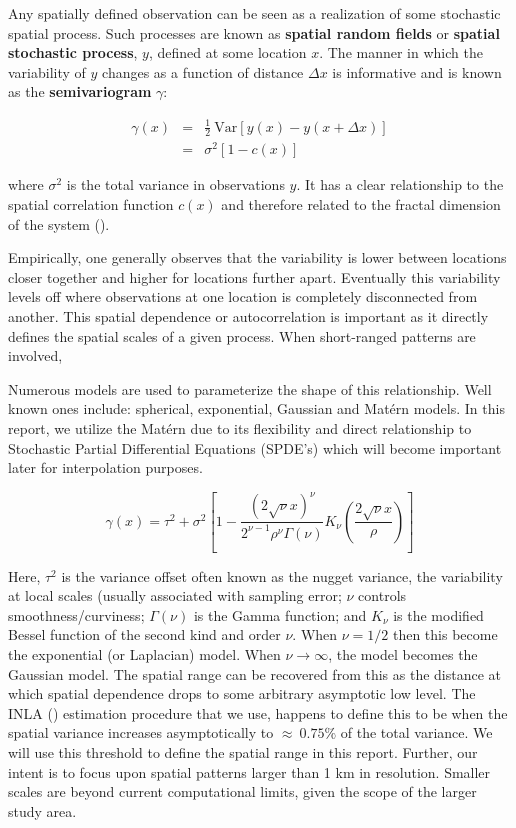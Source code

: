 \documentclass[letterpaper,portrait,11pt]{scrartcl}
\numberwithin{equation}{section}		%
\numberwithin{figure}{section}		%
\numberwithin{table}{section}				%
\begin{document}
Any spatially defined observation can be seen as a realization of some stochastic spatial process. Such  processes are known as \textbf{spatial random fields} or \textbf{spatial stochastic process}, $y$, defined at some location $x$. The manner in which the variability of $y$ changes as a function of distance $\Delta x$ is informative and is known as the \textbf{semivariogram} $\gamma$:

\begin{eqnarray*}
\label{eq:semivariogram}
\gamma(x) &=& \frac{1}{2} \ \textrm{Var} [ y(x) - y(x + \Delta x)]  \\
&=& \sigma^2 [1-c(x)] 
\end{eqnarray*}

where $\sigma^2$ is the total variance in observations $y$. It has a clear relationship to the spatial correlation function $c(x)$ and therefore related to the fractal dimension of the system (\cite{Schepers:2002:fractals}). 

Empirically, one generally observes that the variability is lower between locations closer together and higher for locations further apart. Eventually this variability levels off where observations at one location is completely disconnected from another. This spatial dependence or autocorrelation is important as it directly defines the spatial scales of a given process. When short-ranged patterns are involved, 

Numerous models are used to parameterize the shape of this relationship. Well known ones include: spherical, exponential, Gaussian and Mat\'{e}rn models. In this report, we utilize the Mat\'{e}rn due to its flexibility and direct relationship to Stochastic Partial Differential Equations (SPDE's) which will become important later for interpolation purposes. 

\begin{equation}
\gamma(x) = \tau^2 + \sigma^2 [ 1 - \frac{{(2\sqrt{\nu}x)}^\nu}{2^{\nu-1} \rho^{\nu} \Gamma(\nu)}
 K_\nu(\frac{2\sqrt{\nu}x}{\rho} ) ]
\end{equation}

Here, $\tau^2$ is the variance offset often known as the nugget variance, the variability at local scales (usually associated with sampling error; $\nu$ controls smoothness/curviness; $\Gamma(\nu)$ is the Gamma function; and $K_{\nu}$ is the modified Bessel function of the second kind and order $\nu$. When $\nu=1/2$ then this become the exponential (or Laplacian) model. When $\nu \longrightarrow \infty$, the model becomes the Gaussian model. The spatial range can be recovered from this as the distance at which spatial dependence drops to some arbitrary asymptotic low level. The INLA (\cite{rinla}) estimation procedure that we use, happens to define this to be when the spatial variance increases asymptotically to $\approx~0.75\%$ of the total variance. We will use this threshold to define the spatial range in this report. Further, our intent is to focus upon spatial patterns larger than 1 km in resolution. Smaller scales are beyond current computational limits, given the scope of the larger study area.
\end{document}
